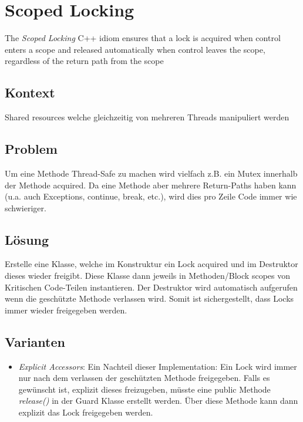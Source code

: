 \section{Scoped Locking}


The \emph{Scoped Locking} C++ idiom ensures that a lock is acquired when control enters a scope and released automatically when control  leaves the scope, regardless of the return path from the scope

\subsection*{Kontext}

Shared resources welche gleichzeitig von mehreren Threads manipuliert werden

\subsection*{Problem}

Um eine Methode Thread-Safe zu machen wird vielfach z.B. ein Mutex innerhalb der Methode acquired. Da eine Methode aber mehrere Return-Paths haben kann (u.a. auch Exceptions, continue, break,  etc.), wird dies pro Zeile Code immer wie schwieriger.

\subsection*{Lösung}

Erstelle eine Klasse, welche im Konstruktur ein Lock acquired und im Destruktor dieses wieder freigibt. Diese Klasse dann jeweils in Methoden/Block scopes von Kritischen Code-Teilen instantieren.
Der Destruktor wird automatisch aufgerufen wenn die geschützte Methode verlassen wird. Somit ist sichergestellt, dass Locks immer wieder freigegeben werden.

\subsection*{Varianten}

\begin{itemize}
	\item \emph{Explicit Accessors}: Ein Nachteil dieser Implementation: Ein Lock wird immer nur nach dem verlassen der geschützten Methode freigegeben. Falls es gewünscht ist, explizit dieses freizugeben, müsste eine public Methode \emph{release()} in der Guard Klasse erstellt werden. Über diese Methode kann dann explizit das Lock freigegeben werden.
\end{itemize}

